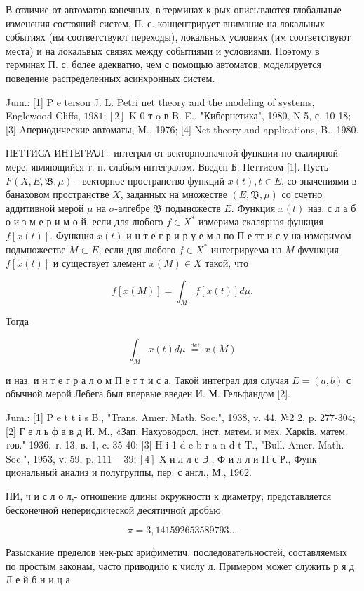 \documentclass[10pt]{article}
\begin{document}
В отличие от автоматов конечных, в терминах к-рых описываются глобальные изменения состояний систем, П. с. концентрирует внимание на локальных событиях (им соответствуют переходы), локальных условиях (им соответствуют места) и на локальвых связях между событиями и условиями. Поэтому в терминах П. с. более адекватно, чем с помощью автоматов, моделируется поведение распределенных асинхронных систем.

Jum.: [1] P e terson J. L. Petri net theory and the modeling of systems, Englewood-Cliffs, $1981 ;[2]$ K 0 т o в B. E., "Кибернетика", 1980, N 5, с. 10-18; [3] Aпериодические автоматы, M., 1976; [4] Net theory and applications, B., 1980.

ПЕТТИСА ИНТЕГРАЛ - интеграл от векторнозначной функции по скалярной мере, являющийся т. н. слабым интегралом. Введен Б. Петтисом [1]. Пусть $F(X, E, \mathfrak{B}, \mu)$ - векторное пространство функций $x(t), t \in E$, со значениями в банаховом пространстве $X$, заданных на множестве $(E, \mathfrak{B}, \mu)$ со счетно аддитивной мерой $\mu$ на $\sigma$-алгебре $\mathfrak{B}$ подмножеств $E$. Функция $x(t)$ наз. с л а б о и з м е р и м о й, если для любого $f \in X^{*}$ измерима скалярная функция $f[x(t)]$. Функция $x(t)$ и н т е г р и р у е м а по П е тт и с у на измеримом подмножестве $M \subset E$, если для любого $f \in X^{*}$ интегрируема на $M$ фуункция $f[x(t)]$ и существует элемент $x(M) \in X$ такой, что

\[
f[x(M)]=\int_{M} f[x(t)] d \mu .
\]

Тогда

\[
\int_{M} x(t) d \mu \stackrel{\text { def }}{=} x(M)
\]

и наз. и н т е г р а л о м П е т т и с а. Такой интеграл для случая $E=(a, b)$ с обычной мерой Лебега был впервые введен И. М. Гельфандом [2].

Jum.: [1] P e t t i s B., "Trans. Amer. Math. Soc.", 1938, v. 44, №2 2, p. 277-304; [2] Г е л ь ф а в д И. М., «Зап. Нахуоводосл. інст. матем. и мех. Харків. матем. тов." 1936, т. 13, в. 1, c. 35-40; [3] H i 1 d e b r a n d t T., "Bull. Amer. Math. Soc.", 1953, v. 59, p. $111-39 ;[4]$ Х и л л е Э., Ф и л л и П с Р., Функ-
циональный анализ и полугруппы, пер. с англ., М., 1962.

ПИ, ч и с л о л,- отношение длины окружности к диаметру; представляется бесконечной непериодической десятичной дробью

\[
\pi=3,141592653589793 \ldots
\]

Разыскание пределов нек-рых арифиметич. последовательностей, составляемых по простым законам, часто приводило к числу л. Примером может служить р я д Л е й б н и ц а
\end{document}
